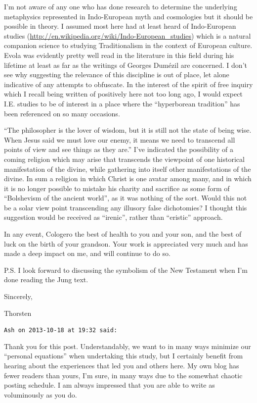\begin{footnotesize}
\begin{sffamily}
I'm not aware of any one who has done research to determine the underlying metaphysics represented in Indo-European myth and cosmologies but it should be possible in theory. I assumed most here had at least heard of Indo-European studies (\url{http://en.wikipedia.org/wiki/Indo-European\_studies}) which is a natural companion science to studying Traditionalism in the context of European culture. Evola was evidently pretty well read in the literature in this field during his lifetime at least as far as the writings of Georges Dumézil are concerned. I don't see why suggesting the relevance of this discipline is out of place, let alone indicative of any attempts to obfuscate. In the interest of the spirit of free inquiry which I recall being written of positively here not too long ago, I would expect I.E. studies to be of interest in a place where the ``hyperborean tradition'' has been referenced on so many occasions.

``The philosopher is the lover of wisdom, but it is still not the state of being wise. When Jesus said we must love our enemy, it means we need to transcend all points of view and see things as they are.'' I've indicated the possibility of a coming religion which may arise that transcends the viewpoint of one historical manifestation of the divine, while gathering into itself other manifestations of the divine. In sum a religion in which Christ is one avatar among many, and in which it is no longer possible to mistake his charity and sacrifice as some form of ``Bolshevism of the ancient world'', as it was nothing of the sort. Would this not be a solar view point transcending any illusory false dichotomies? I thought this suggestion would be received as ``irenic'', rather than ``eristic'' approach.

In any event, Cologero the best of health to you and your son, and the best of luck on the birth of your grandson. Your work is appreciated very much and has made a deep impact on me, and will continue to do so.

P.S. I look forward to discussing the symbolism of the New Testament when I'm done reading the Jung text.

Sincerely,

Thorsten

\hfill

\texttt{Ash on 2013-10-18 at 19:32 said:}

Thank you for this post. Understandably, we want to in many ways minimize our ``personal equations'' when undertaking this study, but I certainly benefit from hearing about the experiences that led you and others here. My own blog has fewer readers than yours, I'm sure, in many ways due to the somewhat chaotic posting schedule. I am always impressed that you are able to write as voluminously as you do.


\end{sffamily}
\end{footnotesize}
